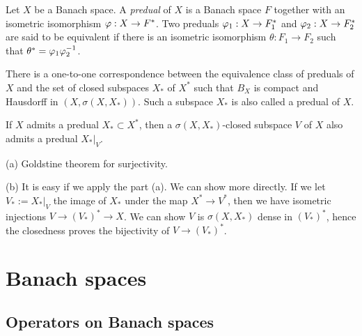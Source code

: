 \documentclass{../../large}
\begin{document}
\begin{prb}[Preduals]
Let $X$ be a Banach space.
A \emph{predual} of $X$ is a Banach space $F$ together with an isometric isomorphism $\varphi:X\to F^*$.
Two preduals $\varphi_1:X\to F_1^*$ and $\varphi_2:X\to F_2^*$ are said to be equivalent if there is an isometric isomorphism $\theta:F_1\to F_2$ such that $\theta^*=\varphi_1\varphi_2^{-1}$.
\begin{parts}
\item There is a one-to-one correspondence between the equivalence class of preduals of $X$ and the set of closed subspaces $X_*$ of $X^*$ such that $B_X$ is compact and Hausdorff in $(X,\sigma(X,X_*))$.
Such a subspace $X_*$ is also called a predual of $X$.
\item If $X$ admits a predual $X_*\subset X^*$, then a $\sigma(X,X_*)$-closed subspace $V$ of $X$ also admits a predual $X_*|_V$.
\end{parts}
\end{prb}
\begin{pf}
(a) Goldstine theorem for surjectivity.

(b)
It is easy if we apply the part (a).
We can show more directly.
If we let $V_*:=X_*|_V$ the image of $X_*$ under the map $X^*\to V^*$, then we have isometric injections $V\to(V_*)^*\to X$.
We can show $V$ is $\sigma(X,X_*)$ dense in $(V_*)^*$, hence the closedness proves the bijectivity of $V\to(V_*)^*$.
\end{pf}

\begin{prb}

\end{prb}



















\part{Banach spaces}




\chapter{Operators on Banach spaces}
\end{document}
